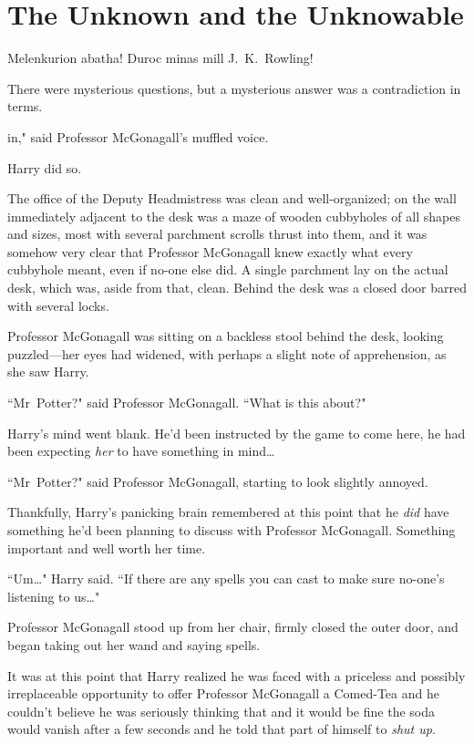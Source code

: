 \chapter{The Unknown and the Unknowable}

\begin{chapterOpeningAuthorNote}
Melenkurion abatha! Duroc minas mill J.~K.~Rowling!
\end{chapterOpeningAuthorNote}
\begin{chapterOpeningQuote}
There were mysterious questions, but a mysterious answer was a contradiction in terms.
\end{chapterOpeningQuote}

 in," said Professor McGonagall's muffled voice.

\hplettrineextrapara
Harry did so.

The office of the Deputy Headmistress was clean and well-organized; on the wall immediately adjacent to the desk was a maze of wooden cubbyholes of all shapes and sizes, most with several parchment scrolls thrust into them, and it was somehow very clear that Professor McGonagall knew exactly what every cubbyhole meant, even if no-one else did. A single parchment lay on the actual desk, which was, aside from that, clean. Behind the desk was a closed door barred with several locks.

Professor McGonagall was sitting on a backless stool behind the desk, looking puzzled—her eyes had widened, with perhaps a slight note of apprehension, as she saw Harry.

``Mr~Potter?" said Professor McGonagall. ``What is this about?"

Harry's mind went blank. He'd been instructed by the game to come here, he had been expecting \emph{her} to have something in mind{\ldots}

``Mr~Potter?" said Professor McGonagall, starting to look slightly annoyed.

Thankfully, Harry's panicking brain remembered at this point that he \emph{did} have something he'd been planning to discuss with Professor McGonagall. Something important and well worth her time.

``Um{\ldots}" Harry said. ``If there are any spells you can cast to make sure no-one's listening to us{\ldots}"

Professor McGonagall stood up from her chair, firmly closed the outer door, and began taking out her wand and saying spells.

It was at this point that Harry realized he was faced with a priceless and possibly irreplaceable opportunity to offer Professor McGonagall a Comed-Tea and he couldn't believe he was seriously thinking that and it would be fine the soda would vanish after a few seconds and he told that part of himself to \emph{shut up}.

